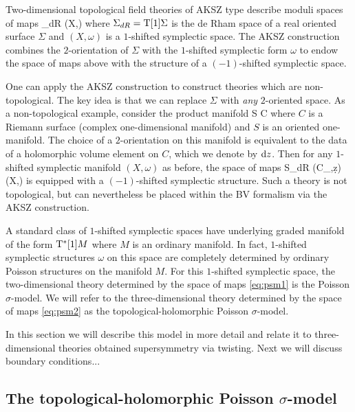 \documentclass[../main.tex]{subfiles}
\begin{document}
 


Two-dimensional topological field theories of AKSZ type describe moduli spaces of maps
\beqn
\label{eq:psm1}
\Sigma_{dR} \to (X,\omega)
\eeqn
where $\Sigma_{dR} = {\rm T}[1] \Sigma$ is the de Rham space of a real oriented surface $\Sigma$ and $(X,\omega)$ is a $1$-shifted symplectic space.
The AKSZ construction combines the $2$-orientation of $\Sigma$ with the $1$-shifted symplectic form $\omega$ to endow the space of maps above with the structure of a $(-1)$-shifted symplectic space.

One can apply the AKSZ construction to construct theories which are non-topological.
The key idea is that we can replace $\Sigma$ with \textit{any} $2$-oriented space.
As a non-topological example, consider the product manifold
\beqn
S \times C
\eeqn
where $C$ is a Riemann surface (complex one-dimensional manifold) and $S$ is an oriented one-manifold.
The choice of a $2$-orientation on this manifold is equivalent to the data of a holomorphic volume element on $C$, which we denote by ${\rm d} z$.
Then for any $1$-shifted symplectic manifold $(X,\omega)$ as before, the space of maps
\beqn\label{eq:psm2}
S_{dR} \times (C_{\dbar},\d z) \to (X,\omega)
\eeqn
is equipped with a $(-1)$-shifted symplectic structure.
Such a theory is not topological, but can nevertheless be placed within the BV formalism via the AKSZ construction.

A standard class of $1$-shifted symplectic spaces have underlying graded manifold of the form ${\rm T}^* [1] M$ where $M$ is an ordinary manifold.
In fact, $1$-shifted symplectic structures $\omega$ on this space are completely determined by ordinary Poisson structures on the manifold $M$.
For this $1$-shifted symplectic space, the two-dimensional theory determined by the space of maps \eqref{eq:psm1} is the Poisson $\sigma$-model.
We will refer to the three-dimensional theory determined by the space of maps \eqref{eq:psm2} as the topological-holomorphic Poisson $\sigma$-model.

In this section we will describe this model in more detail and relate it to three-dimensional theories obtained supersymmetry via twisting.
Next we will discuss boundary conditions...

\subsection{The topological-holomorphic Poisson $\sigma$-model}
\end{document}
